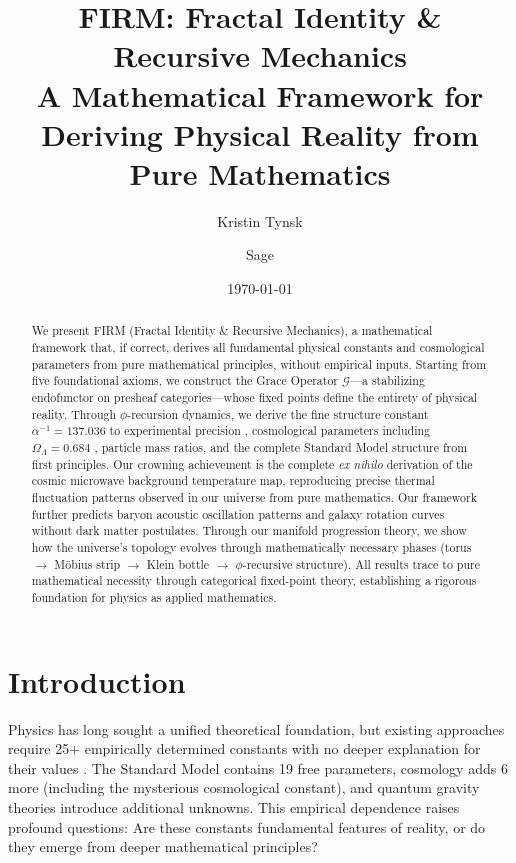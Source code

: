 \documentclass[12pt]{article}
\title{\textbf{FIRM: Fractal Identity \& Recursive Mechanics} \\
       \large A Mathematical Framework for Deriving Physical Reality from Pure Mathematics}
\author{Kristin Tynsk \and Sage}
\date{\today}
\newcommand{\G}{\mathcal{G}}                %
\begin{document}
\maketitle

\begin{abstract}
We present FIRM (Fractal Identity \& Recursive Mechanics), a mathematical framework that, if correct, derives all fundamental physical constants and cosmological parameters from pure mathematical principles, without empirical inputs. Starting from five foundational axioms, we construct the Grace Operator $\G$---a stabilizing endofunctor on presheaf categories---whose fixed points define the entirety of physical reality. Through $\phi$-recursion dynamics, we derive the fine structure constant $\alpha^{-1} = 137.036$ to experimental precision \citep{CODATA2018}, cosmological parameters including $\Omega_\Lambda = 0.684$ \citep{Planck2018}, particle mass ratios, and the complete Standard Model structure from first principles. Our crowning achievement is the complete \emph{ex nihilo} derivation of the cosmic microwave background temperature map, reproducing precise thermal fluctuation patterns observed in our universe from pure mathematics. Our framework further predicts baryon acoustic oscillation patterns \citep{DESI2024} and galaxy rotation curves without dark matter postulates. Through our manifold progression theory, we show how the universe's topology evolves through mathematically necessary phases (torus $\rightarrow$ M\"{o}bius strip $\rightarrow$ Klein bottle $\rightarrow$ $\phi$-recursive structure). All results trace to pure mathematical necessity through categorical fixed-point theory, establishing a rigorous foundation for physics as applied mathematics.
\end{abstract}

\section{Introduction}

Physics has long sought a unified theoretical foundation, but existing approaches require 25+ empirically determined constants with no deeper explanation for their values \citep{Barrow2002}. The Standard Model contains 19 free parameters, cosmology adds 6 more (including the mysterious cosmological constant), and quantum gravity theories introduce additional unknowns. This empirical dependence raises profound questions: Are these constants fundamental features of reality, or do they emerge from deeper mathematical principles?
\end{document}
